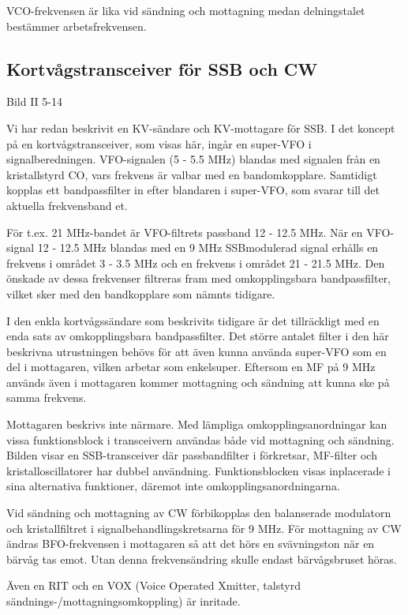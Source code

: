 VCO-frekvensen är lika vid sändning och mottagning medan delningstalet
bestämmer arbetsfrekvensen.

\subsection{Kortvågstransceiver för SSB och CW}

Bild II 5-14

Vi har redan beskrivit en KV-sändare och KV-mottagare för SSB. I det
koncept på en kortvågstransceiver, som visas här, ingår en super-VFO i
signalberedningen. VFO-signalen (5 - 5.5 MHz) blandas med signalen
från en kristallstyrd CO, vars frekvens är valbar med en
bandomkopplare. Samtidigt kopplas ett bandpassfilter in efter
blandaren i super-VFO, som svarar till det aktuella frekvensband et.

För t.ex. 21 MHz-bandet är VFO-filtrets passband 12 - 12.5 MHz. När en
VFO-signal 12 - 12.5 MHz blandas med en 9 MHz SSBmodulerad signal
erhålls en frekvens i området 3 - 3.5 MHz och en frekvens i området
21 - 21.5 MHz. Den önskade av dessa frekvenser filtreras fram med
omkopplingsbara bandpassfilter, vilket sker med den bandkopplare som
nämnts tidigare.

I den enkla kortvågssändare som beskrivits tidigare är det
tillräckligt med en enda sats av omkopplingsbara bandpassfilter. Det
större antalet filter i den här beskrivna utrustningen behövs för att
även kunna använda super-VFO som en del i mottagaren, vilken arbetar
som enkelsuper. Eftersom en MF på 9 MHz används även i mottagaren
kommer mottagning och sändning att kunna ske på samma frekvens.

Mottagaren beskrivs inte närmare. Med lämpliga omkopplingsanordningar
kan vissa funktionsblock i transceivern användas både vid mottagning
och sändning. Bilden visar en SSB-transceiver där passbandfilter i
förkretsar, MF-filter och kristalloscillatorer har dubbel
användning. Funktionsblocken visas inplacerade i sina alternativa
funktioner, däremot inte omkopplingsanordningarna.

Vid sändning och mottagning av CW förbikopplas den balanserade
modulatorn och kristallfiltret i signalbehandlingskretsarna för 9
MHz. För mottagning av CW ändras BFO-frekvensen i mottagaren så att
det hörs en svävningston när en bärvåg tas emot. Utan denna
frekvensändring skulle endast bärvågsbruset höras.

Även en RIT och en VOX (Voice Operated Xmitter, talstyrd
sändnings-/mottagningsomkoppling) är inritade.

